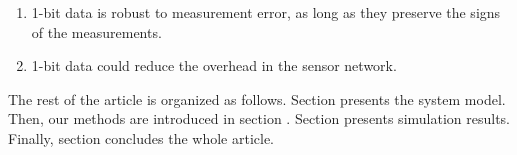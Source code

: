 \begin{enumerate}[(1)]
\item  1-bit data is robust to measurement error, as long as they preserve the signs of the measurements.

\item 1-bit data could reduce the overhead in the sensor network. 

\end{enumerate}

The rest of the article is organized as follows. Section \uppercase\expandafter{} presents the system model.
Then, our methods are introduced in section \uppercase\expandafter{}.
Section \uppercase\expandafter{} presents simulation results. 
Finally, section \uppercase\expandafter{} concludes the whole article.



